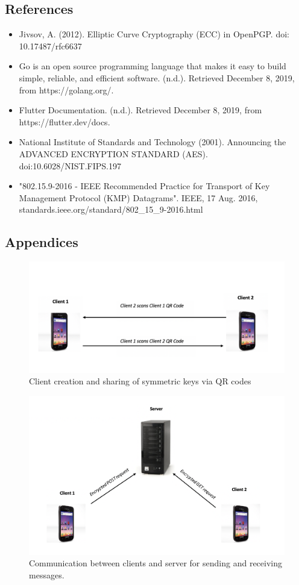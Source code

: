\documentclass[11pt]{article}
\begin{document}
\subsection{References}
\begin{itemize}
	\item{Jivsov, A. (2012). Elliptic Curve Cryptography (ECC) in OpenPGP. doi: 10.17487/rfc6637}
	\item{Go is an open source programming language that makes it easy to build simple, reliable, and efficient software. (n.d.). Retrieved December 8, 2019, from https://golang.org/.}
	\item{Flutter Documentation. (n.d.). Retrieved December 8, 2019, from https://flutter.dev/docs.}
	\item{National Institute of Standards and Technology (2001). Announcing the ADVANCED ENCRYPTION STANDARD (AES). doi:10.6028/NIST.FIPS.197}
	\item{"802.15.9-2016 - IEEE Recommended Practice for Transport of Key Management Protocol (KMP) Datagrams". IEEE, 17 Aug. 2016, standards.ieee.org/standard/802\_15\_9-2016.html}
\end{itemize}
\subsection{Appendices}
\begin{figure}[h!]
  \centerline{\includegraphics[width=\linewidth]{cc.png}}
  \caption{Client creation and sharing of symmetric keys via QR codes}
  \label{fig:client_client}
\end{figure}

\begin{figure}[h!]
  \centerline{\includegraphics[width=\linewidth]{cs.png}}
  \caption{Communication between clients and server for sending and receiving messages.}
  \label{fig:client_client}
\end{figure}
\end{document}
